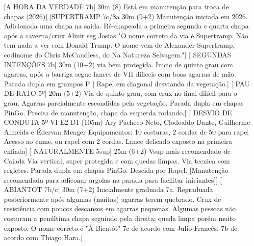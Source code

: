 \begin{CGSectorRoutes}
    [A HORA DA VERDADE 7b| 30m (8) Está em manutenção para troca de chapas (2026)]
    [SUPERTRAMP 7c/8a 30m (9+2) Manutenção iniciada em 2026. Adicionada uma chapa na saida. Ré-chapeada a primeira segunda e quarta chapa após a caverna/crux Almir 
seg Josias "O nome correto da via é Supertramp. Não tem nada a ver com Donald Trump. O nome vem de Alexander Supertramp, codinome do Chris McCandless, do Na Natureza Selvagem."]
    [ SEGUNDAS INTENÇÕES 7b| 30m (10+2) via bem protegida. Inicio de quinto grau com agarras, após a barriga segue lances de VII díficeis com boas agarras de mão. Parada dupla em grampos P | Rapel em diagonal desviando da vegetação.]
    [ PAU DE RATO 5º| 20m (5+2) Via de quinto grau, com crux no final difícil para o grau. Agarras parcialmente escondidas pela vegetação. Parada dupla em chapas PinGo. 
Precisa de manutenção, chapa da esquerda rodando.]
    [ DESVIO DE CONDUTA 5º VI E2 D1 (105m) Ary Pacheco Neto, Clodoaldo Dante, Guilherme Almeida e Édervan Menger Equipamentos: 10 costuras, 2 cordas de 50 para rapel Acesso ao cume, ou rapel com 2 cordas. Lance delicado exposto na primeira enfiada]
    [ NATURALMENTE 5sup| 25m (6+2) Vsup mais recomendado de Caiada Via vertical, super protegida e com quedas limpas. Via tecnica com regletes. Parada dupla em chapas PinGo. Descida por Rapel. [Manutenção recomendada para adiconar argolas na parada para facilitar iniciantes]]
    [ ABIANTOT 7b/c| 30m (7+2) Inicialmente graduada 7a. Regraduada posteriormente após algumas (muitas) agarras terem quebrado. Crux de resistência com poucos descansos em agarras pequenas. Algumas pessoas não costuram a penúltima chapa seguindo pela direita; queda limpa porém muito exposto. O nome correto é "À Bientôt" 7c de acordo com Julio Francês, 7b de acordo com Thiago Hara.]
\end{CGSectorRoutes}

